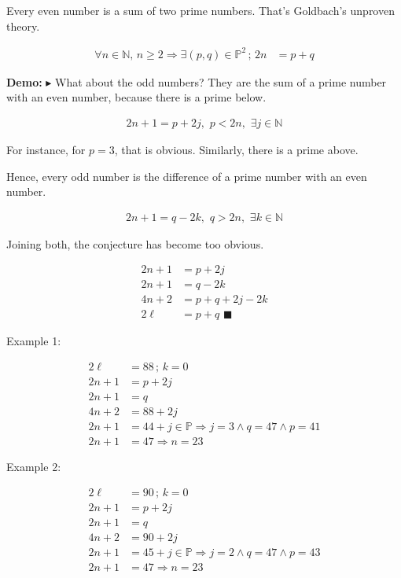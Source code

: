\documentclass[12pt]{article}
\begin{document}
Every even number is a sum of two prime numbers. That's Goldbach's unproven theory.

\begin{align}
  \forall n \in \mathbb{N},\, n \ge 2 \Rightarrow \exists (p, q) \in \mathbb{P}^2\,;\,2n &= p + q
\end{align}

\textbf{Demo:} $\blacktriangleright$ What about the odd numbers? They are the sum of a prime number with an even number, because there is a prime below.

\begin{align}
  2n + 1 = p + 2j,\,\, p < 2n,\,\,\exists j \in \mathbb{N}
\end{align}

For instance, for $p = 3$, that is obvious. Similarly, there is a prime above. 

Hence, every odd number is the difference of a prime number with an even number.

\begin{align}
  2n + 1 = q - 2k,\,\, q > 2n,\,\,\exists k \in \mathbb{N}
\end{align}

Joining both, the conjecture has become too obvious.

\begin{align}
  2n + 1 &= p + 2j \\
  2n + 1 &= q - 2k \\
  4n + 2 &= p + q + 2j - 2k \\
  2\ell &= p + q\,\,\blacksquare
\end{align}

Example 1: 

\begin{align}
  2\ell &= 88\,;\,k = 0 \\
  2n + 1 &= p + 2j \\
  2n + 1 &= q \\
  4n + 2 &= 88 + 2j \\
  2n + 1 &= 44 + j \in \mathbb{P} \Rightarrow j = 3 \wedge q = 47 \wedge p = 41  \\
  2n + 1 &= 47 \Rightarrow n = 23
\end{align}

Example 2: 

\begin{align}
  2\ell &= 90\,;\,k = 0 \\
  2n + 1 &= p + 2j \\
  2n + 1 &= q \\
  4n + 2 &= 90 + 2j \\
  2n + 1 &= 45 + j \in \mathbb{P} \Rightarrow j = 2 \wedge q = 47 \wedge p = 43 \\
  2n + 1 &= 47 \Rightarrow n = 23 
\end{align}
\end{document}
